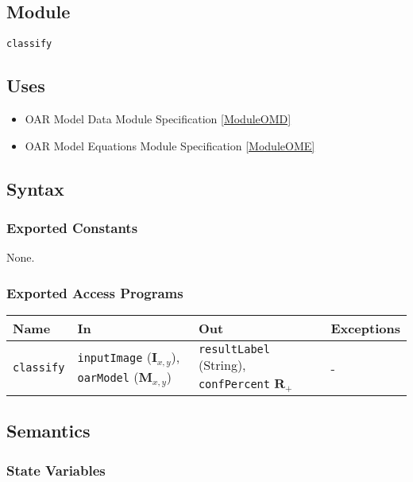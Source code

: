 \documentclass[12pt, titlepage]{article}
\def\code#1{\texttt{#1}}
\begin{document}
\subsection{Module}

\code{classify}

\subsection{Uses}

\begin{itemize}
  \item OAR Model Data Module Specification \ref{ModuleOMD}
  \item OAR Model Equations Module Specification \ref{ModuleOME}
\end{itemize}

\subsection{Syntax}

\subsubsection{Exported Constants}

None.

\subsubsection{Exported Access Programs}

\begin{center}
\begin{tabular}{p{2cm} p{4cm} p{4cm} p{2cm}}
\hline
\textbf{Name} & \textbf{In} & \textbf{Out} & \textbf{Exceptions} \\
\hline
\code{classify} & \code{inputImage} ($\mathbf{I}_{x,y}$), \code{oarModel} ($\mathbf{M}_{x,y}$) & \code{resultLabel} (String), \code{confPercent} $\mathbf{R}_{+}$ & - \\
\hline
\end{tabular}
\end{center}

\subsection{Semantics}

\subsubsection{State Variables}
\end{document}
